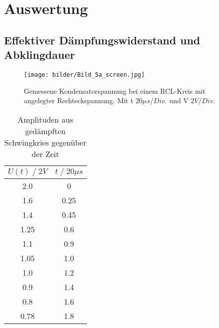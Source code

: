\newpage
\section{Auswertung}
\subsection{Effektiver Dämpfungswiderstand und Abklingdauer}
\begin{figure}
    \centering
    \texttt{[image: bilder/Bild\_5a\_screen.jpg]}
    \caption{
        Gemessene Kondensatorspannung bei einem RCL-Kreis mit angelegter Rechteckspannung. 
        Mit t $20\mu s/Div.$ und V $ 2V/Div.$
        }
    \label{fig:bild1}
\end{figure}

\begin{table}
    \centering
    \begin{tabular}{c c}
        \toprule
        $U(t)\;/\;2V$ & $t\;/\;20\mu s$\\
        \midrule
        2.0     &0   \\
        1.6     &0.25\\
        1.4     &0.45\\
        1.25    &0.6\\
        1.1     &0.9\\
        1.05    &1.0\\
        1.0     &1.2\\
        0.9     &1.4\\
        0.8     &1.6\\
        0.78    &1.8\\
        \bottomrule
    \end{tabular}
    \caption{Amplituden aus gedämpften Schwingkries gegenüber der Zeit}
    \label{tab:tabelle1}
\end{table}

